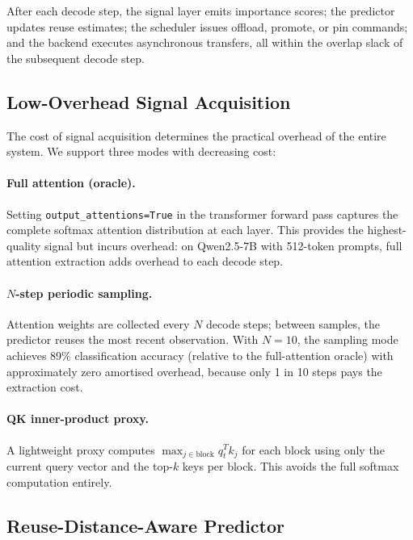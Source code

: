 \documentclass[acmsmall,nonacm,screen]{acmart}
\begin{document}
After each decode step, the signal layer emits importance scores; the
predictor updates reuse estimates; the scheduler issues offload, promote,
or pin commands; and the backend executes asynchronous transfers, all
within the overlap slack of the subsequent decode step.

\subsection{Low-Overhead Signal Acquisition}\label{sec:design:signal}

The cost of signal acquisition determines the practical overhead of the
entire system.  We support three modes with decreasing cost:

\paragraph{Full attention (oracle).}
Setting \texttt{output\_attentions=True} in the transformer forward pass
captures the complete softmax attention distribution at each layer.  This
provides the highest-quality signal but incurs overhead: on Qwen2.5-7B with
512-token prompts, full attention extraction adds overhead to each decode
step.

\paragraph{$N$-step periodic sampling.}
Attention weights are collected every $N$ decode steps; between samples,
the predictor reuses the most recent observation.  With $N{=}10$, the
sampling mode achieves 89\% classification accuracy (relative to the
full-attention oracle) with approximately zero amortised overhead, because
only 1 in 10 steps pays the extraction cost.

\paragraph{QK inner-product proxy.}
A lightweight proxy computes $\max_{j \in \text{block}} q_t^T k_j$ for each
block using only the current query vector and the top-$k$ keys per block.
This avoids the full softmax computation entirely.

\subsection{Reuse-Distance-Aware Predictor}\label{sec:design:predictor}
\end{document}
